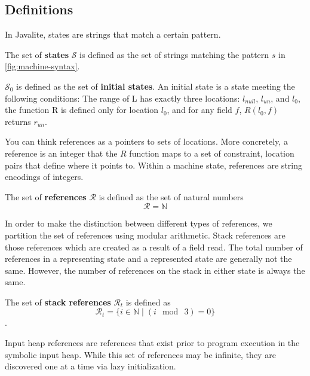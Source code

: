 \subsection{Definitions}

In Javalite, states are strings that match a certain pattern. 

\begin{definition}
\label{def:state}
The set of \textbf{states} $\mathcal{S}$ is defined as the set of strings matching the pattern $s$ in \ref{fig:machine-syntax}.
\end{definition}

\begin{definition}
\label{def:initstate}
$\mathcal{S}_0$ is defined as the set of \textbf{initial states}. An initial state is a state meeting the following conditions:  The range of L has exactly three locations: $l_{null}$, $l_{un}$, and $l_0$, the function R is defined only for location $l_0$, and for any field $f$, $R(l_0,f)$ returns $r_{un}$. 
\end{definition}

You can think references as a pointers to sets of locations. More concretely, a reference is an integer that the $R$ function maps to a set of constraint, location pairs that define where it points to. Within a machine state, references are string encodings of integers.

\begin{definition}
The set of \textbf{references} $\mathcal{R}$ is defined as the set of natural numbers
 $$\mathcal{R} = \mathbb{N}$$
\end{definition}

In order to make the distinction between different types of references, we partition the set of references using modular arithmetic. Stack references are those references which are created as a result of a field read. The total number of references in a representing state and a represented state are generally not the same. However, the number of references on the stack in either state is always the same. 

\begin{definition}
The set of \textbf{stack references} $\mathcal{R}_t$ is defined as
 $$\mathcal{R}_t =\{i \in \mathbb{N} \mid ( i\ \bmod\ 3 ) = 0\}$$. 
\end{definition}

Input heap references are references that exist prior to program execution in the symbolic input heap. While this set of references may be infinite, they are discovered one at a time via lazy initialization.

